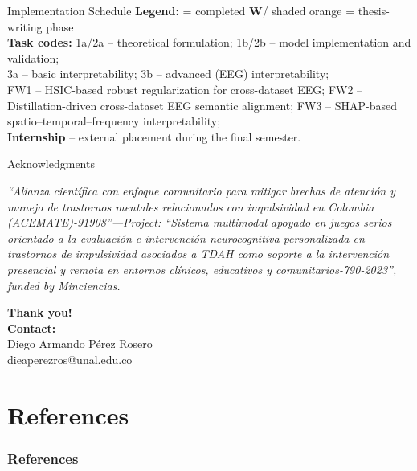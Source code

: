\documentclass[aspectratio=169]{beamer}
\newcommand{\cmark}{\checkmark}
\newcommand{\wmark}{\textbf{W}} %
\begin{document}
\begin{frame}{Implementation Schedule}
\vspace{0.6em}
\tiny
\textbf{Legend:} \cmark = completed \hspace{1em} \wmark / shaded orange = thesis-writing phase\\[0.4ex]
\textbf{Task codes:}
1a/2a – theoretical formulation; 1b/2b – model implementation and validation;\\
3a – basic interpretability; 3b – advanced (EEG) interpretability;\\
FW1 – HSIC-based robust regularization for cross-dataset EEG; FW2 – Distillation-driven cross-dataset EEG semantic alignment; FW3 – SHAP-based spatio–temporal–frequency interpretability;\\
\textbf{Internship} – external placement during the final semester.
\end{frame}

\begin{frame}{Acknowledgments}


   \textit{“Alianza científica con enfoque comunitario para mitigar brechas de atención y manejo de trastornos mentales relacionados con impulsividad en Colombia (ACEMATE)-91908”—Project: “Sistema multimodal apoyado en juegos serios orientado a la evaluación e intervención neurocognitiva personalizada en trastornos de impulsividad asociados a TDAH como soporte a la intervención presencial y remota en entornos clínicos, educativos y comunitarios-790-2023”, funded by Minciencias.}




\begin{center}
	{\Huge{\textbf{\textcolor[rgb]{0.00,0.00,1.00}{Thank you!}}}}\\
	\vspace{0.2cm}
    \textbf{Contact:}\\
    \vspace{0.2cm}
	 Diego Armando Pérez Rosero\\ {\scriptsize{dieaperezros@unal.edu.co}}\\
\end{center}    
    
\end{frame}


\section{References}

\begin{frame}[allowframebreaks]%
\frametitle{References}
{\tiny 


}
\end{frame}
\end{document}
